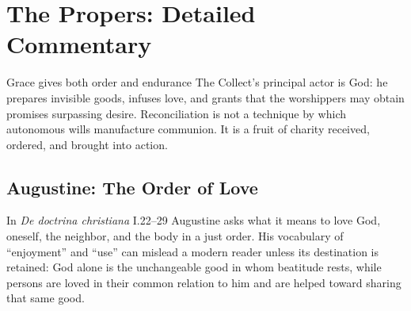 \section*{The Propers: Detailed Commentary}

\begin{massbox}{Grace gives both order and endurance\enspace{}}
The Collect's principal actor is God: he prepares invisible goods, infuses love, and grants that the worshippers may obtain promises surpassing desire. Reconciliation is not a technique by which autonomous wills manufacture communion. It is a fruit of charity received, ordered, and brought into action.
\end{massbox}

\sectionguard
\subsection*{Augustine: The Order of Love\enspace{}}

In \emph{De doctrina christiana} I.22--29 Augustine asks what it means to love God, oneself, the neighbor, and the body in a just order. His vocabulary of ``enjoyment'' and ``use'' can mislead a modern reader unless its destination is retained: God alone is the unchangeable good in whom beatitude rests, while persons are loved in their common relation to him and are helped toward sharing that same good.

